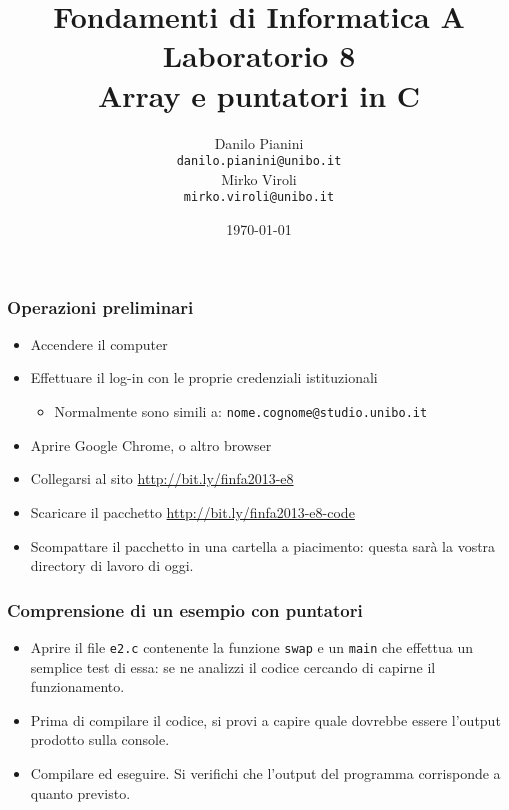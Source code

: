 \documentclass{beamer}
\begin{document}
\title[Lab1 - FV]{Fondamenti di Informatica A \\ Laboratorio 8 \\ Array e puntatori in C}
\author[Danilo Pianini]{Danilo Pianini\\\texttt{danilo.pianini@unibo.it} \\ \vspace{3pt} Mirko Viroli\\\texttt{mirko.viroli@unibo.it} }
\date[\today]{\today}

\frame{\titlepage} 

\begin{frame}
\frametitle{Operazioni preliminari}
\begin{itemize}
 \item Accendere il computer
 \item Effettuare il log-in con le proprie credenziali istituzionali
  \begin{itemize}
    \item Normalmente sono simili a: \texttt{nome.cognome@studio.unibo.it}
  \end{itemize}
 \item Aprire Google Chrome, o altro browser
 \item Collegarsi al sito \url{http://bit.ly/finfa2013-e8}
 \item Scaricare il pacchetto \url{http://bit.ly/finfa2013-e8-code}
 \item Scompattare il pacchetto in una cartella a piacimento: questa sarà la vostra directory di lavoro di oggi.
\end{itemize}
\end{frame}

\begin{frame}
\frametitle{Comprensione di un esempio con puntatori}
\begin{itemize}
 \item Aprire il file \texttt{e2.c} contenente la funzione \texttt{swap} e un \texttt{main} che effettua un semplice test di essa: se ne analizzi il codice cercando di capirne il funzionamento.
 \item Prima di compilare il codice, si provi a capire quale dovrebbe essere l'output prodotto sulla console.
 \item Compilare ed eseguire. Si verifichi che l'output del programma corrisponde a quanto previsto.
\end{itemize}
\end{frame}
\end{document}
